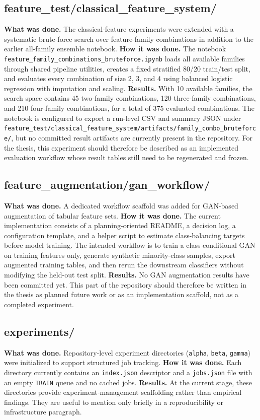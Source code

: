 \subsection{feature\_test/classical\_feature\_system/}
\textbf{What was done.} The classical-feature experiments were extended with a systematic brute-force search over feature-family combinations in addition to the earlier all-family ensemble notebook.
\textbf{How it was done.} The notebook \texttt{feature\_family\_combinations\_bruteforce.ipynb} loads all available families through shared pipeline utilities, creates a fixed stratified 80/20 train/test split, and evaluates every combination of size 2, 3, and 4 using balanced logistic regression with imputation and scaling.
\textbf{Results.} With 10 available families, the search space contains 45 two-family combinations, 120 three-family combinations, and 210 four-family combinations, for a total of 375 evaluated combinations. The notebook is configured to export a run-level CSV and summary JSON under \texttt{feature\_test/classical\_feature\_system/artifacts/family\_combo\_bruteforce/}, but no committed result artifacts are currently present in the repository. For the thesis, this experiment should therefore be described as an implemented evaluation workflow whose result tables still need to be regenerated and frozen.
\subsection{feature\_augmentation/gan\_workflow/}
\textbf{What was done.} A dedicated workflow scaffold was added for GAN-based augmentation of tabular feature sets.
\textbf{How it was done.} The current implementation consists of a planning-oriented README, a decision log, a configuration template, and a helper script to estimate class-balancing targets before model training. The intended workflow is to train a class-conditional GAN on training features only, generate synthetic minority-class samples, export augmented training tables, and then rerun the downstream classifiers without modifying the held-out test split.
\textbf{Results.} No GAN augmentation results have been committed yet. This part of the repository should therefore be written in the thesis as planned future work or as an implementation scaffold, not as a completed experiment.
\subsection{experiments/}
\textbf{What was done.} Repository-level experiment directories (\texttt{alpha}, \texttt{beta}, \texttt{gamma}) were initialized to support structured job tracking.
\textbf{How it was done.} Each directory currently contains an \texttt{index.json} descriptor and a \texttt{jobs.json} file with an empty \texttt{TRAIN} queue and no cached jobs.
\textbf{Results.} At the current stage, these directories provide experiment-management scaffolding rather than empirical findings. They are useful to mention only briefly in a reproducibility or infrastructure paragraph.
